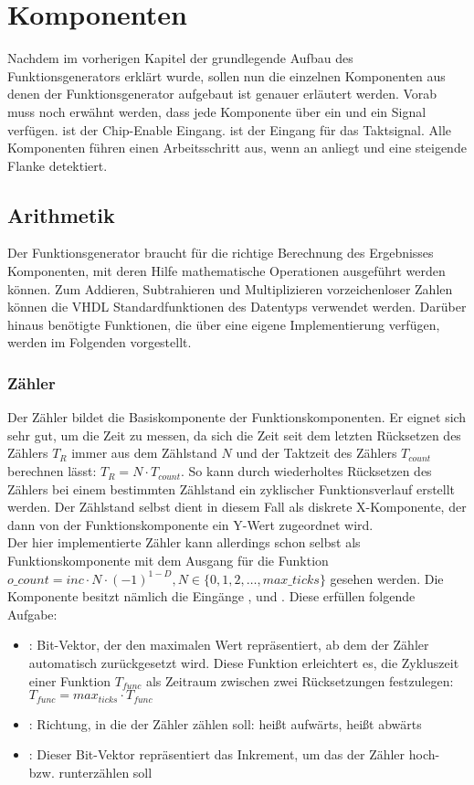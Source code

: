 \chapter{Komponenten}
Nachdem im vorherigen Kapitel der grundlegende Aufbau des Funktionsgenerators erklärt wurde, sollen nun die einzelnen Komponenten aus denen der Funktionsgenerator aufgebaut ist genauer erläutert werden.
Vorab muss noch erwähnt werden, dass jede Komponente über ein  und ein  Signal verfügen.
 ist der Chip-Enable Eingang.  ist der Eingang für das Taktsignal.
Alle Komponenten führen einen Arbeitsschritt aus, wenn an   anliegt und  eine steigende Flanke detektiert.

\section{Arithmetik}
Der Funktionsgenerator braucht für die richtige Berechnung des Ergebnisses Komponenten, mit deren Hilfe mathematische Operationen ausgeführt werden können.
Zum Addieren, Subtrahieren und Multiplizieren vorzeichenloser Zahlen können die VHDL Standardfunktionen des Datentyps  verwendet werden.
Darüber hinaus benötigte Funktionen, die über eine eigene Implementierung verfügen, werden im Folgenden vorgestellt.

\subsection{Zähler} \label{Comp:Arith:Count}
Der Zähler bildet die Basiskomponente der Funktionskomponenten. Er eignet sich sehr gut, um die Zeit zu messen, da sich die Zeit seit dem letzten Rücksetzen des Zählers $T_{R}$ immer aus dem Zählstand $N$ und der Taktzeit des Zählers $T_{count}$ berechnen lässt: $T_{R} = N \cdot T_{count}$. So kann durch wiederholtes Rücksetzen des Zählers bei einem bestimmten Zählstand ein zyklischer Funktionsverlauf erstellt werden.
Der Zählstand selbst dient in diesem Fall als diskrete X-Komponente, der dann von der Funktionskomponente ein Y-Wert zugeordnet wird.\\
Der hier implementierte Zähler kann allerdings schon selbst als Funktionskomponente mit dem Ausgang  für die Funktion $o\_count = inc \cdot N \cdot (-1) ^ {1 - D}, N \in \{0, 1, 2, \dots, max\_ticks\}$ gesehen werden.
Die Komponente besitzt nämlich die Eingänge ,  und . Diese erfüllen folgende Aufgabe:
\begin{itemize}
\item {}: Bit-Vektor, der den maximalen Wert repräsentiert, ab dem der Zähler automatisch zurückgesetzt wird.
Diese Funktion erleichtert es, die Zykluszeit einer Funktion $T_{func}$ als Zeitraum zwischen zwei Rücksetzungen festzulegen: $T_{func} = max_{ticks} \cdot T_{func}$
\item {}: Richtung, in die der Zähler zählen soll:  heißt aufwärts,  heißt abwärts
  \item {}: Dieser Bit-Vektor repräsentiert das Inkrement, um das der Zähler hoch- bzw. runterzählen soll
\end{itemize}

